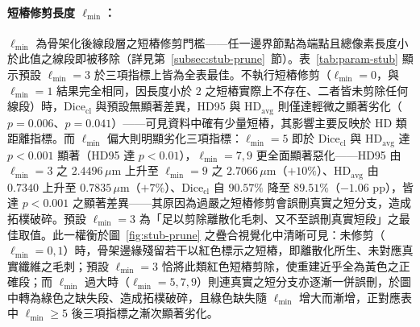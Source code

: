 \paragraph{短樁修剪長度 $\ell_{\min}$：} $\ell_{\min}$ 為骨架化後線段層之短樁修剪門檻——任一邊界節點為端點且總像素長度小於此值之線段即被移除（詳見第~\ref{subsec:stub-prune}~節）。表~\ref{tab:param-stub} 顯示預設 $\ell_{\min} = 3$ 於三項指標上皆為全表最佳。不執行短樁修剪（$\ell_{\min} = 0$，與 $\ell_{\min} = 1$ 結果完全相同，因長度小於 $2$ 之短樁實際上不存在、二者皆未剪除任何線段）時，$\text{Dice}_{\text{cl}}$ 與預設無顯著差異，HD95 與 $\text{HD}_{\text{avg}}$ 則僅達輕微之顯著劣化（$p = 0.006$、$p = 0.041$）——可見資料中確有少量短樁，其影響主要反映於 HD 類距離指標。而 $\ell_{\min}$ 偏大則明顯劣化三項指標：$\ell_{\min} = 5$ 即於 $\text{Dice}_{\text{cl}}$ 與 $\text{HD}_{\text{avg}}$ 達 $p < 0.001$ 顯著（HD95 達 $p < 0.01$），$\ell_{\min} = 7, 9$ 更全面顯著惡化——HD95 由 $\ell_{\min} = 3$ 之 $2.4496\,\mu\text{m}$ 上升至 $\ell_{\min} = 9$ 之 $2.7066\,\mu\text{m}$（$+10\%$）、$\text{HD}_{\text{avg}}$ 由 $0.7340$ 上升至 $0.7835\,\mu\text{m}$（$+7\%$）、$\text{Dice}_{\text{cl}}$ 自 $90.57\%$ 降至 $89.51\%$（$-1.06$ pp），皆達 $p < 0.001$ 之顯著差異——其原因為過嚴之短樁修剪會誤刪真實之短分支，造成拓樸破碎。預設 $\ell_{\min} = 3$ 為「足以剪除離散化毛刺、又不至誤刪真實短段」之最佳取值。此一權衡於圖~\ref{fig:stub-prune} 之疊合視覺化中清晰可見：未修剪（$\ell_{\min} = 0, 1$）時，骨架邊緣殘留若干以紅色標示之短樁，即離散化所生、未對應真實纖維之毛刺；預設 $\ell_{\min} = 3$ 恰將此類紅色短樁剪除，使重建近乎全為黃色之正確段；而 $\ell_{\min}$ 過大時（$\ell_{\min} = 5, 7, 9$）則連真實之短分支亦逐漸一併誤刪，於圖中轉為綠色之缺失段、造成拓樸破碎，且綠色缺失隨 $\ell_{\min}$ 增大而漸增，正對應表中 $\ell_{\min} \ge 5$ 後三項指標之漸次顯著劣化。

